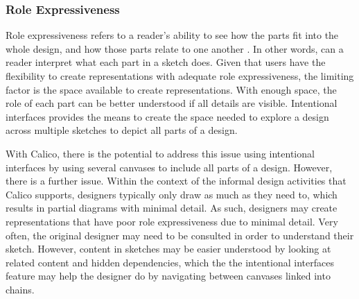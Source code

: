 
\subsubsection{Role Expressiveness}

Role expressiveness refers to a reader's ability to see how the parts fit into the whole design, and how those parts relate to one another \cite{Petre2013BookChapter}. In other words, can a reader interpret what each part in a sketch does. Given that users have the flexibility to create representations with adequate role expressiveness, the limiting factor is the space available to create representations. With enough space, the role of each part can be better understood if all details are visible. Intentional interfaces provides the means to create the space needed to explore a design across multiple sketches to depict all parts of a design.

With Calico, there is the potential to address this issue using intentional interfaces by using several canvases to include all parts of a design. However, there is a further issue. Within the context of the informal design activities that Calico supports, designers typically only draw as much as they need to, which results in partial diagrams with minimal detail. As such, designers may create representations that have poor role expressiveness due to minimal detail. Very often, the original designer may need to be consulted in order to understand their sketch. However, content in sketches may be easier understood by looking at related content and hidden dependencies, which the the intentional interfaces feature may help the designer do by navigating between canvases linked into chains. 

